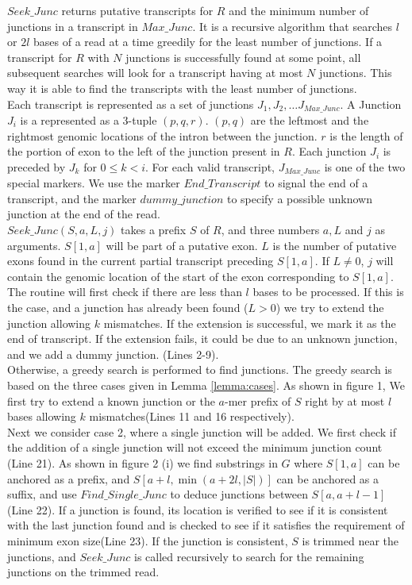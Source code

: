 \documentclass{article}
\begin{document}
$Seek\_Junc$ returns putative transcripts for $R$ and the minimum number of junctions in a transcript in $Max\_Junc$. It is a recursive algorithm that searches $l$ or $2l$ bases of a read at a time greedily for the least number of junctions. If a transcript for $R$ with $N$ junctions is successfully found at some point, all subsequent searches will look for a transcript having at most $N$ junctions. This way it is able to find the transcripts with the least number of junctions.\\

Each transcript is represented as a set of junctions $J_1,J_2,\dots J_{Max\_Junc}$. A Junction $J_i$ is a represented as a 3-tuple $(p,q,r)$. $(p,q)$ are the leftmost and the rightmost genomic locations of the intron between the junction. $r$ is the length of the portion of exon to the left of the junction present in $R$. Each junction $J_i$ is preceded by $J_k$ for $0\leq k<i$. For each valid transcript, $J_{Max\_Junc}$ is one of the two special markers. We use the marker $End\_Transcript$ to signal the end of a transcript, and the marker $dummy\_junction$ to specify a possible unknown junction at the end of the read. \\ 

$Seek\_Junc(S,a,L,j)$ takes a prefix $S$ of $R$, and three numbers $a,L$ and $j$ as arguments. $S[1,a]$ will be part of a putative exon. $L$ is the number of putative exons found in the current partial transcript preceding $S[1,a]$. If $L\neq 0$, $j$ will contain the genomic location of the start of the exon corresponding to $S[1,a]$.\\ 

The routine will first check if there are less than $l$ bases to be processed. If this is the case, and a junction has already been found ($L>0$) we try to extend the junction allowing $k$ mismatches. If the extension is successful, we mark it as the end of transcript. If the extension fails, it could be due to an unknown junction, and we add a dummy junction. (Lines 2-9).\\ 

Otherwise, a greedy search  is performed to find junctions. The greedy search is based on the three cases given in Lemma \ref{lemma:cases}. As shown in figure 1, We first try to extend a known junction or the $a$-mer prefix of $S$ right by at most $l$ bases allowing $k$ mismatches(Lines 11 and 16 respectively).\\

Next we consider case 2, where a single junction will be added. We first check if the addition of a single junction will not exceed the minimum junction count (Line 21). As shown in figure 2 (i) we find substrings in $G$ where $S[1,a]$ can be anchored as a prefix, and $S[a+l,\min(a+2l,|S|)]$ can be anchored as a suffix, and use $Find\_Single\_Junc$ to deduce junctions between $S[a,a+l-1]$ (Line 22). If a junction is found, its location is verified to see if it is consistent with the last junction found and is checked to see if it satisfies the requirement of minimum exon size(Line 23). If the junction is consistent, $S$ is trimmed near the junctions, and $Seek\_Junc$ is called recursively to search for the remaining junctions on the trimmed read.\\
\end{document}
